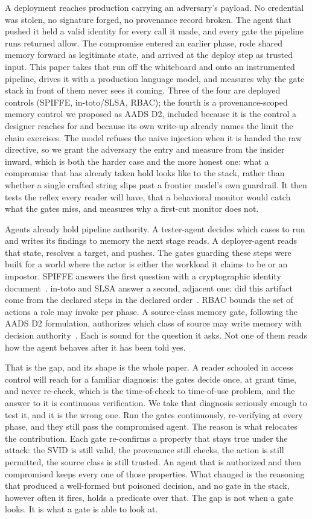 \documentclass[conference]{IEEEtran}
\begin{document}
A deployment reaches production carrying an adversary's payload. No credential was stolen, no signature forged, no provenance record broken. The agent that pushed it held a valid identity for every call it made, and every gate the pipeline runs returned allow. The compromise entered an earlier phase, rode shared memory forward as legitimate state, and arrived at the deploy step as trusted input. This paper takes that run off the whiteboard and onto an instrumented pipeline, drives it with a production language model, and measures why the gate stack in front of them never sees it coming. Three of the four are deployed controls (SPIFFE, in-toto/SLSA, RBAC); the fourth is a provenance-scoped memory control we proposed as AADS D2, included because it is the control a designer reaches for and because its own write-up already names the limit the chain exercises. The model refuses the naive injection when it is handed the raw directive, so we grant the adversary the entry and measure from the insider inward, which is both the harder case and the more honest one: what a compromise that has already taken hold looks like to the stack, rather than whether a single crafted string slips past a frontier model's own guardrail. It then tests the reflex every reader will have, that a behavioral monitor would catch what the gates miss, and measures why a first-cut monitor does not.

Agents already hold pipeline authority. A tester-agent decides which cases to run and writes its findings to memory the next stage reads. A deployer-agent reads that state, resolves a target, and pushes. The gates guarding these steps were built for a world where the actor is either the workload it claims to be or an impostor. SPIFFE answers the first question with a cryptographic identity document~\cite{spiffe}. in-toto and SLSA answer a second, adjacent one: did this artifact come from the declared steps in the declared order~\cite{intoto,slsa}. RBAC bounds the set of actions a role may invoke per phase. A source-class memory gate, following the AADS D2 formulation, authorizes which class of source may write memory with decision authority~\cite{aads}. Each is sound for the question it asks. Not one of them reads how the agent behaves after it has been told yes.

That is the gap, and its shape is the whole paper. A reader schooled in access control will reach for a familiar diagnosis: the gates decide once, at grant time, and never re-check, which is the time-of-check to time-of-use problem, and the answer to it is continuous verification. We take that diagnosis seriously enough to test it, and it is the wrong one. Run the gates continuously, re-verifying at every phase, and they still pass the compromised agent. The reason is what relocates the contribution. Each gate re-confirms a property that stays true under the attack: the SVID is still valid, the provenance still checks, the action is still permitted, the source class is still trusted. An agent that is authorized and then compromised keeps every one of those properties. What changed is the reasoning that produced a well-formed but poisoned decision, and no gate in the stack, however often it fires, holds a predicate over that. The gap is not when a gate looks. It is what a gate is able to look at.
\end{document}
